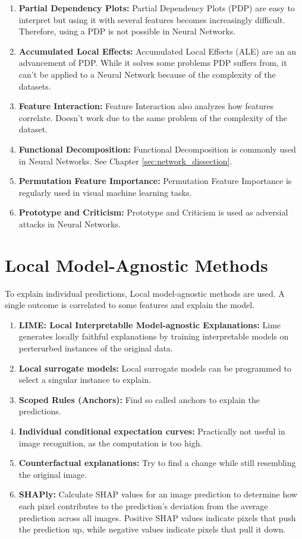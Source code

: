 \begin{enumerate}
	\item \textbf{Partial Dependency Plots:} Partial Dependency Plots (PDP) are easy to interpret but using it with several features becomes increasingly difficult. Therefore, using a PDP is not possible in Neural Networks.
	\item \textbf{Accumulated Local Effects:} Accumulated Local Effects (ALE) are an an advancement of PDP. While it solves some problems PDP suffers from, it can't be applied to a Neural Network because of the complexity of the datasets.
	\item \textbf{Feature Interaction:} Feature Interaction also analyzes how features correlate. Doesn't work due to the same problem of the complexity of the dataset.
	\item \textbf{Functional Decomposition:} Functional Decomposition is commonly used in Neural Networks. See Chapter \ref{sec:network_dissection}.
	\item \textbf{Permutation Feature Importance:} Permutation Feature Importance is regularly used in visual machine learning tasks.
	\item \textbf{Prototype and Criticism:} Prototype and Criticism is used as adversial attacks in Neural Networks.
	
\end{enumerate}


\section{Local Model-Agnostic Methods}

To explain individual predictions, Local model-agnostic methods are used. A single outcome is correlated to some features and explain the model.


\begin{enumerate}
	\item \textbf{LIME: Local Interpretablle Model-agnostic Explanations:} Lime generates locally faithful explanations by training interpretable models on perterurbed instances of the original data.
	\item \textbf{Local surrogate models:} Local surrogate models can be programmed to select a singular instance to explain.
	\item \textbf{Scoped Rules (Anchors):} Find so called anchors to explain the predictions.
	\item \textbf{Individual conditional expectation curves:} Practically not useful in image recognition, as the computation is too high.
	\item \textbf{Counterfactual explanations:} Try to find a change while still resembling the original image.
	\item \textbf{SHAPly:} Calculate SHAP values for an image prediction to determine how each pixel contributes to the prediction's deviation from the average prediction across all images.
	Positive SHAP values indicate pixels that push the prediction up, while negative values indicate pixels that pull it down.
\end{enumerate}



